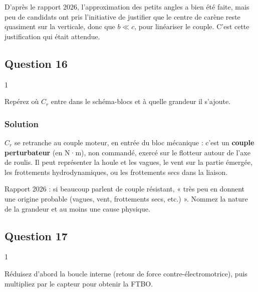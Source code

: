 \documentclass[11pt,a4paper]{article}
\begin{document}
\begin{jury}

D'après le rapport 2026, l'approximation des petits angles a bien été faite, mais peu de candidats ont pris l'initiative de justifier que le centre de carène reste quasiment sur la verticale, donc que \(b\ll c\), pour linéariser le couple. C'est cette justification qui était attendue.

\end{jury}

\hypertarget{question-16}{%
\subsection{Question 16}\label{question-16}}

\begin{indication}{1}

Repérez où \(C_r\) entre dans le schéma-blocs et à quelle grandeur il s'ajoute.

\end{indication}

\hypertarget{solution-15}{%
\subsubsection{Solution}\label{solution-15}}

\(C_r\) se retranche au couple moteur, en entrée du bloc mécanique : c'est un \textbf{couple perturbateur} (en N·m), non commandé, exercé sur le flotteur autour de l'axe de roulis. Il peut représenter la houle et les vagues, le vent sur la partie émergée, les frottements hydrodynamiques, ou les frottements secs dans la liaison.

\begin{jury}

Rapport 2026 : si beaucoup parlent de couple résistant, « très peu en donnent une origine probable (vagues, vent, frottements secs, etc.) ». Nommez la nature de la grandeur et au moins une cause physique.

\end{jury}

\hypertarget{question-17}{%
\subsection{Question 17}\label{question-17}}

\begin{indication}{1}

Réduisez d'abord la boucle interne (retour de force contre-électromotrice), puis multipliez par le capteur pour obtenir la FTBO.

\end{indication}
\end{document}
